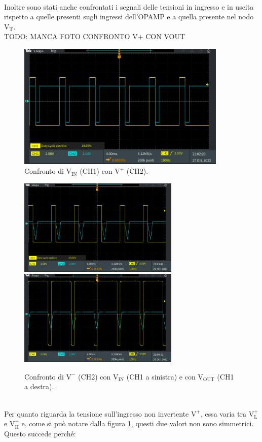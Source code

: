 \documentclass{report}
\begin{document}
\\[16pt]Inoltre sono stati anche confrontati i segnali delle tensioni in ingresso e in uscita rispetto a quelle presenti sugli ingressi dell'OPAMP e a quella presente nel nodo $\mathrm{V_T}$.
\\TODO: MANCA FOTO CONFRONTO V+ CON VOUT
\begin{figure}[h]
	\centering
	\includegraphics[height=6cm]{immagini/TEK00003}
	\caption{Confronto di $\mathrm{V_{IN}}$ (CH1) con $\mathrm{V^+}$ (CH2).}
	\label{figura:TEK00003}
\end{figure}
\begin{figure}[h]
	\centering
	\includegraphics[height=4.6cm]{immagini/TEK00004}
	\includegraphics[height=4.6cm]{immagini/TEK00005}
	\caption{Confronto di $\mathrm{V^-}$ (CH2) con $\mathrm{V_{IN}}$ (CH1 a sinistra) e con $\mathrm{V_{OUT}}$ (CH1 a destra).}
	\label{figura:TEK00004e5}
\end{figure}
\\Per quanto riguarda la tensione sull'ingresso non invertente $\mathrm{V^+}$, essa varia tra $\mathrm{V_L^+}$ e $\mathrm{V_H^+}$ e, come si può notare dalla figura \ref{figura:TEK00003}, questi due valori non sono simmetrici. Questo succede perché:
\end{document}
